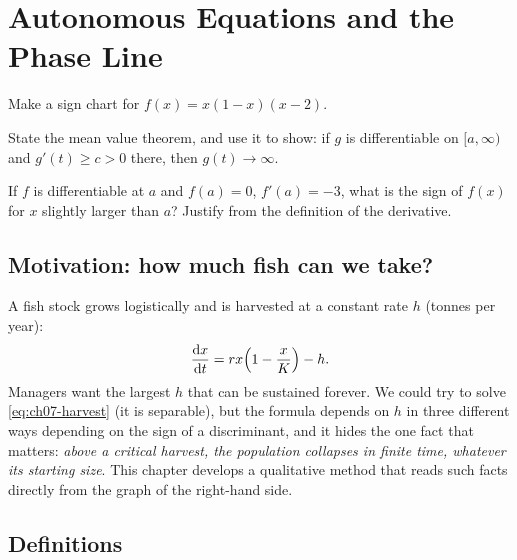 \chapter{Autonomous Equations and the Phase Line}\label{ch:ch07}

\begin{diagnostic}
  \item Make a sign chart for $f(x) = x(1-x)(x-2)$.
  \item State the mean value theorem, and use it to show: if $g$ is
        differentiable on $[a,\infty)$ and $g'(t)\ge c>0$ there, then
        $g(t)\to\infty$.
  \item If $f$ is differentiable at $a$ and $f(a) = 0$, $f'(a) = -3$, what is
        the sign of $f(x)$ for $x$ slightly larger than $a$? Justify from the
        definition of the derivative.
\end{diagnostic}

\section{Motivation: how much fish can we take?}\label{sec:ch07-motivation}

A fish stock grows logistically and is harvested at a constant rate $h$
(tonnes per year):
\begin{equation}\label{eq:ch07-harvest}
  \frac{\mathrm{d}x}{\mathrm{d}t} = rx\Bigl(1 - \frac xK\Bigr) - h .
\end{equation}
Managers want the largest $h$ that can be sustained forever. We could try to
solve \eqref{eq:ch07-harvest} (it is separable), but the formula depends on
$h$ in three different ways depending on the sign of a discriminant, and it
hides the one fact that matters: \emph{above a critical harvest, the
population collapses in finite time, whatever its starting size}. This
chapter develops a qualitative method that reads such facts directly from the
graph of the right-hand side.


\section{Definitions}\label{sec:ch07-defs}

